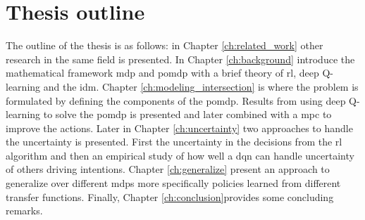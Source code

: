 \section{Thesis outline}
The outline of the thesis is as follows: in Chapter \ref{ch:related_work} other research in the same field is presented. In Chapter \ref{ch:background} introduce the mathematical framework \gls{mdp} and \gls{pomdp} with a brief theory of \gls{rl}, deep Q-learning and the \gls{idm}. 
Chapter \ref{ch:modeling_intersection} is where the problem is formulated by defining the components of the \gls{pomdp}. Results from using deep Q-learning to solve the \gls{pomdp} is presented and later combined with a \gls{mpc} to improve the actions. Later in Chapter \ref{ch:uncertainty} two approaches to handle the uncertainty is presented. First the uncertainty in the decisions from the \gls{rl} algorithm and then an empirical study of how well a \gls{dqn} can handle uncertainty of others driving intentions. Chapter \ref{ch:generalize} present an approach to generalize over different \gls{mdp}s more specifically policies learned from different transfer functions. Finally, Chapter \ref{ch:conclusion}provides some concluding remarks. 

